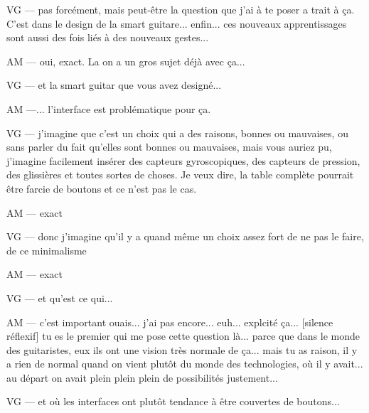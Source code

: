 VG — pas forcément, mais peut-être la question que j'ai à te poser a trait à ça. C'est dans le design de la smart guitare... enfin... ces nouveaux apprentissages sont aussi des fois liés à des nouveaux gestes... 

AM — oui, exact. La on a un gros sujet déjà avec ça... 

VG — et la smart guitar que vous avez designé... 

AM —... l'interface est problématique pour ça. 

VG — j'imagine que c'est un choix qui a des raisons, bonnes ou mauvaises, ou sans parler du fait qu'elles sont bonnes ou mauvaises, mais vous auriez pu, j'imagine facilement insérer des capteurs gyroscopiques, des capteurs de pression, des glissières et toutes sortes de choses. Je veux dire, la table complète pourrait être farcie de boutons et ce n'est pas le cas. 

AM — exact

VG — donc j'imagine qu'il y a quand même un choix assez fort de ne pas le faire, de ce minimalisme 

AM — exact 

VG — et qu'est ce qui... 

AM — c'est important ouais... j'ai pas encore... euh... explcité ça... [silence réflexif] tu es le premier qui me pose cette question là... parce que dans le monde des guitaristes, eux ils ont une vision très normale de ça... mais tu as raison, il y a rien de normal quand on vient plutôt du monde des technologies, où il y avait... au départ on avait plein plein plein de possibilités justement... 

VG — et où les interfaces ont plutôt tendance à être couvertes de boutons... 

